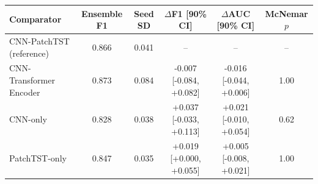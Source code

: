 \begin{tabular}{lccccc}
\toprule
Comparator & Ensemble F1 & Seed SD & $\Delta$F1 [90\% CI] & $\Delta$AUC [90\% CI] & McNemar $p$ \\
\midrule
CNN-PatchTST (reference) & 0.866 & 0.041 & -- & -- & -- \\
CNN-Transformer Encoder & 0.873 & 0.084 & -0.007 [-0.084, +0.082] & -0.016 [-0.044, +0.006] & 1.00 \\
CNN-only & 0.828 & 0.038 & +0.037 [-0.033, +0.113] & +0.021 [-0.010, +0.054] & 0.62 \\
PatchTST-only & 0.847 & 0.035 & +0.019 [+0.000, +0.055] & +0.005 [-0.008, +0.021] & 1.00 \\
\bottomrule
\end{tabular}
